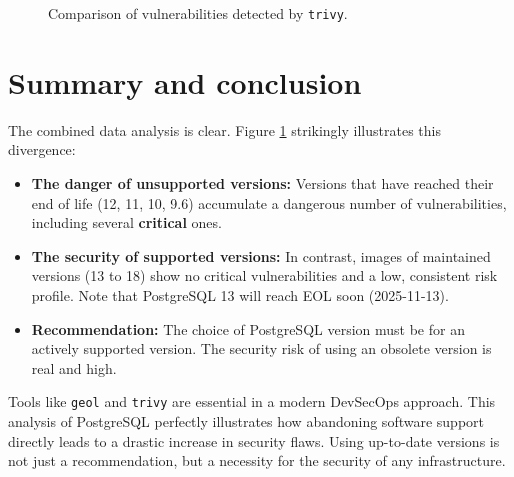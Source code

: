 \documentclass[11pt, a4paper]{article}
\begin{document}
\begin{figure}[h!]
\centering
{}
\caption{Comparison of vulnerabilities detected by \texttt{trivy}.}
\label{fig:vuln-chart}
\end{figure}


\section{Summary and conclusion}

The combined data analysis is clear. Figure \ref{fig:vuln-chart} strikingly illustrates this divergence:

\begin{itemize}
    \item \textbf{The danger of unsupported versions:} Versions that have reached their end of life (12, 11, 10, 9.6) accumulate a dangerous number of vulnerabilities, including several \textbf{critical} ones.
    \item \textbf{The security of supported versions:} In contrast, images of maintained versions (13 to 18) show no critical vulnerabilities and a low, consistent risk profile. Note that PostgreSQL 13 will reach EOL soon (2025-11-13).
    \item \textbf{Recommendation:} The choice of PostgreSQL version must be for an actively supported version. The security risk of using an obsolete version is real and high.\\
\end{itemize}

Tools like \texttt{geol} and \texttt{trivy} are essential in a modern DevSecOps approach. This analysis of PostgreSQL perfectly illustrates how abandoning software support directly leads to a drastic increase in security flaws. Using up-to-date versions is not just a recommendation, but a necessity for the security of any infrastructure.
\end{document}
